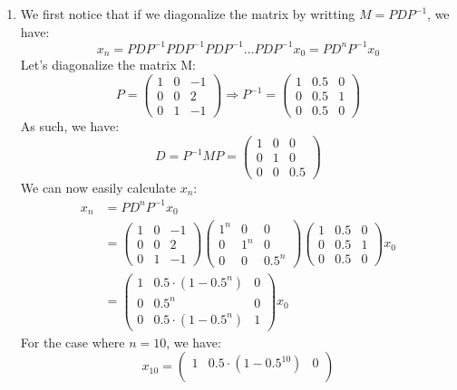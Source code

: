 \documentclass[11pt, legalpaper]{article}
\begin{document}
\begin{enumerate}
    \item We first notice that if we diagonalize the matrix by writting $M=PDP^{-1}$, we have:
    $$x_n=PDP^{-1}PDP^{-1}PDP^{-1}...PDP^{-1}x_0=PD^nP^{-1}x_0$$
    Let's diagonalize the matrix M:
    $$P=\begin{pmatrix}
        1 & 0 & -1 \\
        0 & 0 & 2 \\
        0 & 1 & -1
    \end{pmatrix} \Rightarrow  P^{-1}= \begin{pmatrix}
        1 & 0.5 & 0 \\
        0 & 0.5 & 1 \\
        0 & 0.5 & 0
    \end{pmatrix}$$
    As such, we have:
    $$D=P^{-1}M P=\begin{pmatrix}
        1 & 0 & 0 \\
        0 & 1 & 0 \\
        0 & 0 & 0.5
    \end{pmatrix}$$
    We can now easily calculate $x_n$:
    \begin{align*}
        x_n  &=PD^nP^{-1}x_0\\
                &=\begin{pmatrix}
        1 & 0 & -1 \\
        0 & 0 & 2 \\
        0 & 1 & -1
    \end{pmatrix}\begin{pmatrix}
        1^n & 0 & 0 \\
        0 & 1^n & 0 \\
        0 & 0 & 0.5^n
    \end{pmatrix}\begin{pmatrix}
        1 & 0.5 & 0 \\
        0 & 0.5 & 1 \\
        0 & 0.5 & 0
    \end{pmatrix}x_0\\
    &=\begin{pmatrix}
        1 & 0.5\cdot(1-0.5^n) & 0 \\
        0 & 0.5^n & 0 \\
        0 & 0.5\cdot(1-0.5^n) & 1
    \end{pmatrix} x_0
    \end{align*}
    For the case where $n=10$, we have:
    $$\boxed{x_{10}=\begin{pmatrix}
        1 & 0.5\cdot(1-0.5^{10}) & 0 \\

\end{pmatrix}}$$
\end{enumerate}
\end{document}
